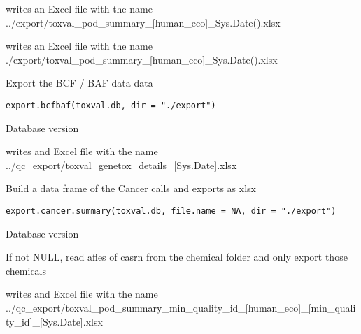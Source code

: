 \documentclass[letterpaper]{book}
\begin{document}
%
\begin{Value}
writes an Excel file with the name
../export/toxval\_pod\_summary\_[human\_eco]\_Sys.Date().xlsx

writes an Excel file with the name
./export/toxval\_pod\_summary\_[human\_eco]\_Sys.Date().xlsx
\end{Value}
%
\begin{Description}\relax
Export the BCF / BAF data data
\end{Description}
%
\begin{Usage}
\begin{verbatim}
export.bcfbaf(toxval.db, dir = "./export")
\end{verbatim}
\end{Usage}
%
\begin{Arguments}
\begin{ldescription}
\item[\code{toxval.db}] Database version
\end{ldescription}
\end{Arguments}
%
\begin{Value}
writes and Excel file with the name
../qc\_export/toxval\_genetox\_details\_[Sys.Date].xlsx
\end{Value}
%
\begin{Description}\relax
Build a data frame of the Cancer calls and exports as xlsx
\end{Description}
%
\begin{Usage}
\begin{verbatim}
export.cancer.summary(toxval.db, file.name = NA, dir = "./export")
\end{verbatim}
\end{Usage}
%
\begin{Arguments}
\begin{ldescription}
\item[\code{toxval.db}] Database version

\item[\code{file.name}] If not NULL, read afles of casrn from the chemical folder and only export
those chemicals
\end{ldescription}
\end{Arguments}
%
\begin{Value}
writes and Excel file with the name
../qc\_export/toxval\_pod\_summary\_min\_quality\_id\_[human\_eco]\_[min\_quality\_id]\_[Sys.Date].xlsx
\end{Value}
\end{document}
